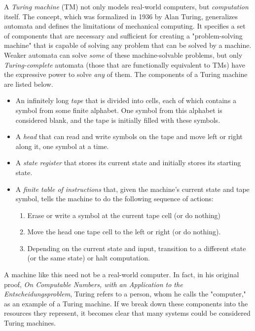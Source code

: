 A \textit{Turing machine} (TM) not only models real-world computers, but \textit{computation} itself. The concept, which was formalized in 1936 by Alan Turing, generalizes automata and defines the limitations of mechanical computing. It specifies a set of components that are necessary and sufficient for creating a "problem-solving machine" that is capable of solving any problem that can be solved by a machine. Weaker automata can solve \textit{some} of these machine-solvable problems, but only \textit{Turing-complete} automata (those that are functionally equivalent to TMs) have the expressive power to solve \textit{any} of them. The components of a Turing machine are listed below.

\begin{itemize}
\item An infinitely long \textit{tape} that is divided into cells, each of which contains a symbol from some finite alphabet. One symbol from this alphabet is considered blank, and the tape is initially filled with these symbols.
\item A \textit{head} that can read and write symbols on the tape and move left or right along it, one symbol at a time.
\item A \textit{state register} that stores its current state and initially stores its starting state.
\item A \textit{finite table of instructions} that, given the machine's current state and tape symbol, tells the machine to do the following sequence of actions:
	\begin{enumerate}
		\item Erase or write a symbol at the current tape cell (or do nothing)
		\item Move the head one tape cell to the left or right (or do nothing).
		\item Depending on the current state and input, transition to a different state (or the same state) or halt computation.
	\end{enumerate}
\end{itemize}

A machine like this need not be a real-world computer. In fact, in his original proof, \textit{On Computable Numbers, with an Application to the Entscheidungsproblem}, Turing refers to a person, whom he calls the "computer," as an example of a Turing machine. If we break down these components into the resources they represent, it becomes clear that many systems could be considered Turing machines.

